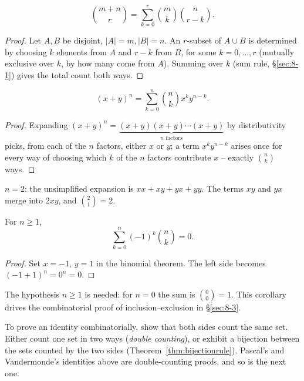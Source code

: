 \documentclass[11pt]{article}
\begin{document}
\begin{theorem}
\[
\binom{m+n}{r} = \sum_{k=0}^r \binom{m}{k}\binom{n}{r-k}.
\]
\end{theorem}
\begin{proof}
Let $A,B$ be disjoint, $|A|=m,|B|=n$. An $r$-subset of $A\cup B$ is determined by choosing $k$ elements from $A$ and $r-k$ from $B$, for some $k=0,\dots,r$ (mutually exclusive over $k$, by how many come from $A$). Summing over $k$ (sum rule, \S\ref{sec:8-1}) gives the total count both ways.
\end{proof}

\begin{theorem}
\[
(x+y)^n = \sum_{k=0}^n \binom{n}{k} x^k y^{n-k}.
\]
\end{theorem}
\begin{proof}
Expanding $(x+y)^n = \underbrace{(x+y)(x+y)\cdots(x+y)}_{n \text{ factors}}$ by distributivity picks, from each of the $n$ factors, either $x$ or $y$; a term $x^ky^{n-k}$ arises once for every way of choosing which $k$ of the $n$ factors contribute $x$ -- exactly $\binom{n}{k}$ ways.
\end{proof}

\begin{example}
$n=2$: the unsimplified expansion is $xx+xy+yx+yy$. The terms $xy$ and $yx$ merge into $2xy$, and $\binom21=2$.
\end{example}

\begin{corollary}
\label{thm:altsum}
For $n\ge1$,
\[
\sum_{k=0}^n(-1)^k\binom{n}{k}=0.
\]
\end{corollary}
\begin{proof}
Set $x=-1$, $y=1$ in the binomial theorem. The left side becomes $(-1+1)^n=0^n=0$.
\end{proof}
\begin{note}
The hypothesis $n\ge1$ is needed: for $n=0$ the sum is $\binom00=1$. This corollary drives the combinatorial proof of inclusion--exclusion in \S\ref{sec:8-3}.
\end{note}

\begin{note}
To prove an identity combinatorially, show that both sides count the same set. Either count one set in two ways (\emph{double counting}), or exhibit a bijection between the sets counted by the two sides (Theorem~\ref{thm:bijectionrule}). Pascal's and Vandermonde's identities above are double-counting proofs, and so is the next one.
\end{note}
\end{document}
